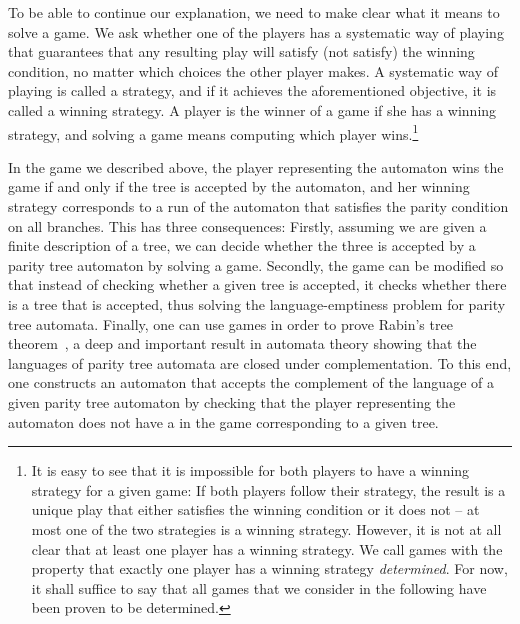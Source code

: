 \documentclass[../../diss.tex]{subfiles}
\begin{document}
To be able to continue our explanation, we need to make clear what it means to solve a game.
We ask whether one of the players has a systematic way of playing that guarantees that any resulting play will satisfy (\resp not satisfy) the winning condition, no matter which choices the other player makes.
A systematic way of playing is called a strategy, and if it achieves the aforementioned objective, it is called a winning strategy.
A player is the winner of a game if she has a winning strategy, and solving a game means computing which player wins.\footnote{%
It is easy to see that it is impossible for both players to have a winning strategy for a given game: If both players follow their strategy, the result is a unique play that either satisfies the winning condition or it does not -- at most one of the two strategies is a winning strategy.
    However, it is not at all clear that at least one player has a winning strategy.
    We call games with the property that exactly one player has a winning strategy \emph{determined}.
    For now, it shall suffice to say that all games that we consider in the following have been proven to be determined.
}

In the game we described above, the player representing the automaton wins the game if and only if the tree is accepted by the automaton, and her winning strategy corresponds to a run of the automaton that satisfies the parity condition on all branches.
This has three consequences:
Firstly, assuming we are given a finite description of a tree, we can decide whether the three is accepted by a parity tree automaton by solving a game.
Secondly, the game can be modified so that instead of checking whether a given tree is accepted, it checks whether there is a tree that is accepted, thus solving the language-emptiness problem for parity tree automata.
Finally, one can use games in order to prove Rabin's tree theorem~\cite{Rabin68,Zielonka98}, a deep and important result in automata theory showing that the languages of parity tree automata are closed under complementation.
To this end, one constructs an automaton that accepts the complement of the language of a given parity tree automaton by checking that the player representing the automaton does not have a  in the game corresponding to a given tree.
\end{document}
